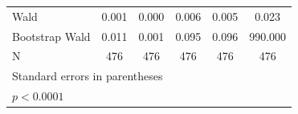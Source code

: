 \begin{table}[htbp]
\begin{tabular}{l*{5}{c}}
\hline
Wald        &       0.001       &       0.000       &       0.006       &       0.005       &       0.023       \\
Bootstrap Wald&       0.011       &       0.001       &       0.095       &       0.096       &     990.000       \\
N           &         476       &         476       &         476       &         476       &         476       \\
\hline\hline
\multicolumn{6}{l}{\footnotesize Standard errors in parentheses}\\
\multicolumn{6}{l}{\footnotesize \sym{*} \(p<0.0001\)}\\
\end{tabular}
\end{table}

